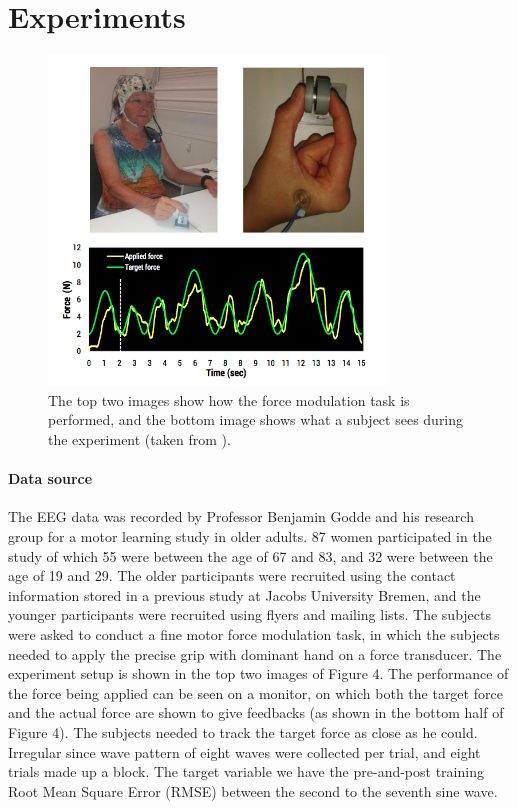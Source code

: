 \documentclass[a4paper,11pt,oneside]{article}
\begin{document}
\section{Experiments}
\begin{figure}[h]
	\centering
	\includegraphics[width=0.8\textwidth]{img/subject}
	\caption{The top two images show how the force modulation task is performed, and the bottom image shows what a subject sees during the experiment (taken from \cite{subject2016}).}
\end{figure}

\paragraph{Data source} The EEG data was recorded by Professor Benjamin Godde and his research group for a motor learning study in older adults. 87 women participated in the study of which 55 were between the age of 67 and 83, and 32 were between the age of 19 and 29. The older participants were recruited using the contact information stored in a previous study at Jacobs University Bremen, and the younger participants were recruited using flyers and mailing lists. The subjects were asked to conduct a fine motor force modulation task, in which the subjects needed to apply the precise grip with dominant hand on a force transducer. The experiment setup is shown in the top two images of Figure 4. The performance of the force being applied can be seen on a monitor, on which both the target force and the actual force are shown to give feedbacks (as shown in the bottom half of Figure 4). The subjects needed to track the target force as close as he could. Irregular since wave pattern of eight waves were collected per trial, and eight trials made up a block. The target variable we have the pre-and-post training Root Mean Square Error (RMSE)   between the second to the seventh sine wave.
\end{document}
